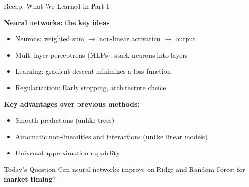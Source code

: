 \documentclass[10pt]{beamer}
\newcommand{\highlight}[1]{\textcolor{AccentOrange}{\textbf{#1}}}
\begin{document}
\begin{frame}{Recap: What We Learned in Part I}

  \textbf{Neural networks: the key ideas}
  \begin{itemize}
    \item Neurons: weighted sum $\rightarrow$ non-linear activation $\rightarrow$ output
    \item Multi-layer perceptrons (MLPs): stack neurons into layers
    \item Learning: gradient descent minimizes a loss function
    \item Regularization: Early stopping, architecture choice
  \end{itemize}

  \vspace{1em}
  \textbf{Key advantages over previous methods:}
  \begin{itemize}
    \item Smooth predictions (unlike trees)
    \item Automatic non-linearities and interactions (unlike linear models)
    \item Universal approximation capability
  \end{itemize}

  \vspace{0.5em}
  \begin{block}{Today's Question}
    Can neural networks improve on Ridge and Random Forest for \highlight{market timing}?
  \end{block}
\end{frame}

\end{document}
